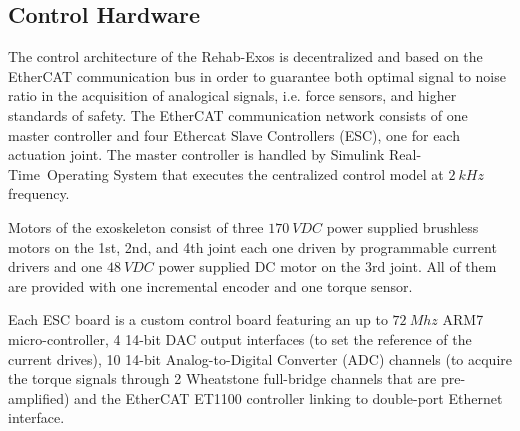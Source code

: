 \subsection{Control Hardware}
The control architecture of the Rehab-Exos is decentralized and based on the EtherCAT communication bus in order to guarantee both optimal signal to noise ratio in the acquisition of analogical signals, i.e. force sensors, and higher standards of safety.
The EtherCAT communication network consists of one master controller and four Ethercat Slave Controllers (ESC), one for each actuation joint.
The master controller is handled by Simulink Real-Time\texttrademark \ Operating System that executes the centralized control model at $2 \ kHz$ frequency.

Motors of the exoskeleton consist of three $170 \ VDC$ power supplied brushless motors on the 1st, 2nd, and 4th joint each one driven by programmable current drivers and one $48 \ VDC$ power supplied DC motor on the 3rd joint.  All of them are provided with one incremental encoder and one torque sensor.

Each ESC board is a custom control board featuring an up to $72 \ Mhz$ ARM7 micro-controller, 4 14-bit DAC output interfaces (to set the reference of the current drives), 10 14-bit Analog-to-Digital Converter (ADC) channels (to acquire the torque signals through 2 Wheatstone full-bridge channels that are pre-amplified) and the EtherCAT ET1100 controller linking to double-port Ethernet interface.

